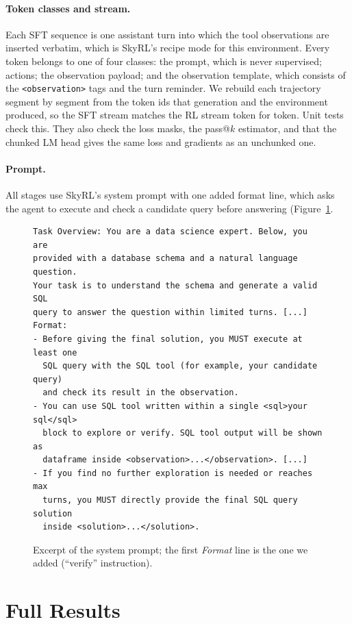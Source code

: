 \paragraph{Token classes and stream.}
Each SFT sequence is one assistant turn into which the tool observations are inserted verbatim, which is SkyRL's recipe mode for this environment. Every token belongs to one of four classes: the prompt, which is never supervised; actions; the observation payload; and the observation template, which consists of the \texttt{<observation>} tags and the turn reminder. We rebuild each trajectory segment by segment from the token ids that generation and the environment produced, so the SFT stream matches the RL stream token for token. Unit tests check this. They also check the loss masks, the pass@$k$ estimator, and that the chunked LM head gives the same loss and gradients as an unchunked one.

\paragraph{Prompt.}
All stages use SkyRL's system prompt with one added format line, which asks the agent to execute and check a candidate query before answering (Figure~\ref{fig:prompt}.

\begin{figure}[t]
\begin{Verbatim}[frame=single,fontsize=\small,framesep=2mm,rulecolor=\color{black!35}]
Task Overview: You are a data science expert. Below, you are
provided with a database schema and a natural language question.
Your task is to understand the schema and generate a valid SQL
query to answer the question within limited turns. [...]
Format:
- Before giving the final solution, you MUST execute at least one
  SQL query with the SQL tool (for example, your candidate query)
  and check its result in the observation.
- You can use SQL tool written within a single <sql>your sql</sql>
  block to explore or verify. SQL tool output will be shown as
  dataframe inside <observation>...</observation>. [...]
- If you find no further exploration is needed or reaches max
  turns, you MUST directly provide the final SQL query solution
  inside <solution>...</solution>.
\end{Verbatim}
\caption{Excerpt of the system prompt; the first \emph{Format} line is the one we added (``verify'' instruction).}
\label{fig:prompt}
\end{figure}

\section{Full Results}
\label{app:full}

